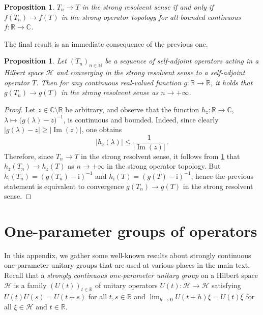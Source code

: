 \documentclass[a4paper, twoside, 11pt, reqno]{amsart}
\theoremstyle{definition}
\theoremstyle{plain}
\newtheorem{proposition}[definition]{Proposition}
\renewcommand{\Im}{\operatorname{Im}}
\newcommand{\N}{\mathbb{N}}
\newcommand{\R}{\mathbb{R}}
\newcommand{\C}{\mathbb{C}}
\newcommand{\MH}{\mathcal{H}}
\newcommand{\ii}{\mathrm{i}}
\newcommand{\1}{\mathbf{1}}
\newcommand{\abs}[2][]{#1\vert{#2}#1\vert}
\begin{document}
\begin{proposition}\label{pro:characterizationSRConvergence}
    $T_n \to T$ in the strong resolvent sense if and only if $f(T_n) \to f(T)$ in the strong operator topology for all bounded continuous $f : \R \to \C$.
\end{proposition}

The final result is an immediate consequence of the previous one.

\begin{proposition}\label{pro:SRimpliesFSR}
    Let $(T_n)_{n \in \N}$ be a sequence of self-adjoint operators acting in a Hilbert space $\MH$ and converging in the strong resolvent sense to a self-adjoint operator $T$. Then for any continuous real-valued function $g : \R \to \R$, it holds that $g(T_n) \to g(T)$ in the strong resolvent sense as $n \to + \infty$.
\end{proposition}

\begin{proof}
    Let $z \in \C \setminus \R$ be arbitrary, and observe that the function $h_z : \R \to \C$, $\lambda \mapsto \bigl(g(\lambda) - z\bigr)^{-1}$, is continuous and bounded. Indeed, since clearly $\abs{g(\lambda) - z} \ge \abs{\Im(z)}$, one obtains
    \begin{equation*}
        \abs{h_z(\lambda)} \le \frac{1}{\abs{\Im(z)}} \, .
    \end{equation*}
    Therefore, since $T_n \to T$ in the strong resolvent sense, it follows from \cref{pro:characterizationSRConvergence} that $h_z(T_n) \to h_z(T)$ as $n \to + \infty$ in the strong operator topology. But $h_\ii(T_n) = (g(T_n) - \ii)^{-1}$ and $h_\ii(T) = (g(T) - \ii)^{-1}$, hence the previous statement is equivalent to convergence $g(T_n) \to g(T)$ in the strong resolvent sense.
\end{proof}



\section{One-parameter groups of operators}\label{app:oneParameterGroups}

In this appendix, we gather some well-known results about strongly continuous one-parameter unitary groups that are used at various places in the main text. Recall that a \emph{strongly continuous one-parameter unitary group} on a Hilbert space $\MH$ is a family $(U(t))_{t \in \R}$ of unitary operators $U(t) : \MH \to \MH$ satisfying $U(t) U(s) = U(t + s)$ for all $t, s \in \R$ and $\lim_{h \to 0} U(t + h) \xi = U(t) \xi$ for all $\xi \in \MH$ and $t \in \R$.
\end{document}
